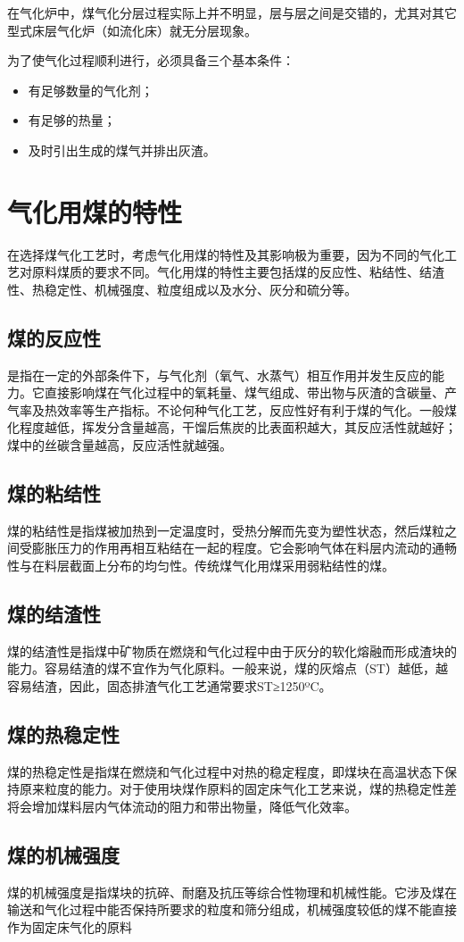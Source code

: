 \documentclass[10pt,openany]{ctexbook}
\begin{document}
在气化炉中，煤气化分层过程实际上并不明显，层与层之间是交错的，尤其对其它型式床层气化炉（如流化床）就无分层现象。\par
为了使气化过程顺利进行，必须具备三个基本条件：
\begin{itemize}
\item 有足够数量的气化剂；
\item 有足够的热量；
\item 及时引出生成的煤气并排出灰渣。
\end{itemize}
\section{气化用煤的特性}
在选择煤气化工艺时，考虑气化用煤的特性及其影响极为重要，因为不同的气化工艺对原料煤质的要求不同。气化用煤的特性主要包括煤的反应性、粘结性、结渣性、热稳定性、机械强度、粒度组成以及水分、灰分和硫分等。
\subsection{煤的反应性}
是指在一定的外部条件下，与气化剂（氧气、水蒸气）相互作用并发生反应的能力。它直接影响煤在气化过程中的氧耗量、煤气组成、带出物与灰渣的含碳量、产气率及热效率等生产指标。不论何种气化工艺，反应性好有利于煤的气化。一般煤化程度越低，挥发分含量越高，干馏后焦炭的比表面积越大，其反应活性就越好；煤中的丝碳含量越高，反应活性就越强。
\subsection{煤的粘结性}
煤的粘结性是指煤被加热到一定温度时，受热分解而先变为塑性状态，然后煤粒之间受膨胀压力的作用再相互粘结在一起的程度。它会影响气体在料层内流动的通畅性与在料层截面上分布的均匀性。传统煤气化用煤采用弱粘结性的煤。
\subsection{煤的结渣性}
      煤的结渣性是指煤中矿物质在燃烧和气化过程中由于灰分的软化熔融而形成渣块的能力。容易结渣的煤不宜作为气化原料。一般来说，煤的灰熔点（ST）越低，越容易结渣，因此，固态排渣气化工艺通常要求ST≥1250ºC。
\subsection{煤的热稳定性}
      煤的热稳定性是指煤在燃烧和气化过程中对热的稳定程度，即煤块在高温状态下保持原来粒度的能力。对于使用块煤作原料的固定床气化工艺来说，煤的热稳定性差将会增加煤料层内气体流动的阻力和带出物量，降低气化效率。
\subsection{煤的机械强度}
煤的机械强度是指煤块的抗碎、耐磨及抗压等综合性物理和机械性能。它涉及煤在输送和气化过程中能否保持所要求的粒度和筛分组成，机械强度较低的煤不能直接作为固定床气化的原料
\end{document}
